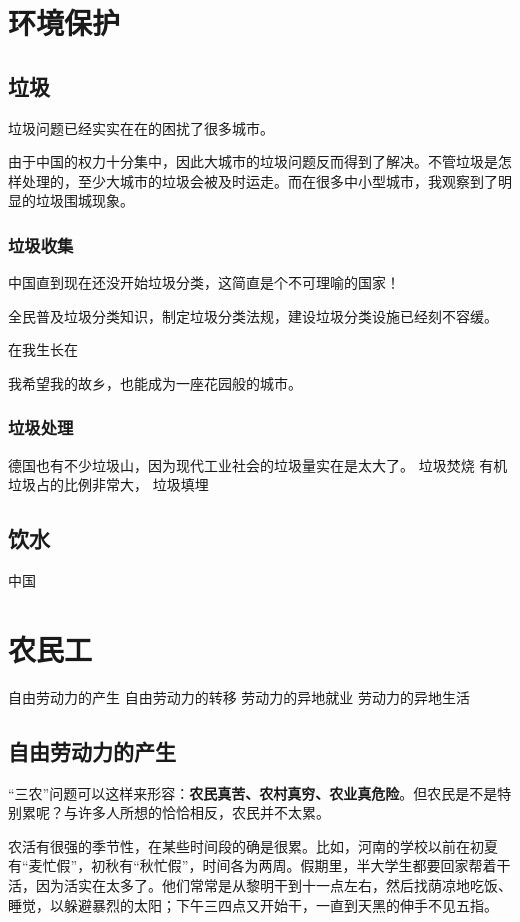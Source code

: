\section{环境保护}



\subsection{垃圾}

垃圾问题已经实实在在的困扰了很多城市。

由于中国的权力十分集中，因此大城市的垃圾问题反而得到了解决。不管垃圾是怎样处理的，至少大城市的垃圾会被及时运走。而在很多中小型城市，我观察到了明显的垃圾围城现象。

\subsubsection{垃圾收集}

中国直到现在还没开始垃圾分类，这简直是个不可理喻的国家！

全民普及垃圾分类知识，制定垃圾分类法规，建设垃圾分类设施已经刻不容缓。

在我生长在

我希望我的故乡，也能成为一座花园般的城市。

\subsubsection{垃圾处理}

德国也有不少垃圾山，因为现代工业社会的垃圾量实在是太大了。
垃圾焚烧
有机垃圾占的比例非常大，
垃圾填埋

\subsection{饮水}
中国

\section{农民工}
自由劳动力的产生
自由劳动力的转移
劳动力的异地就业
劳动力的异地生活

\subsection{自由劳动力的产生}
“三农”问题可以这样来形容：\textbf{农民真苦、农村真穷、农业真危险}。但农民是不是特别累呢？与许多人所想的恰恰相反，农民并不太累。

农活有很强的季节性，在某些时间段的确是很累。比如，河南的学校以前在初夏有“麦忙假”，初秋有“秋忙假”，时间各为两周。假期里，半大学生都要回家帮着干活，因为活实在太多了。他们常常是从黎明干到十一点左右，然后找荫凉地吃饭、睡觉，以躲避暴烈的太阳；下午三四点又开始干，一直到天黑的伸手不见五指。

